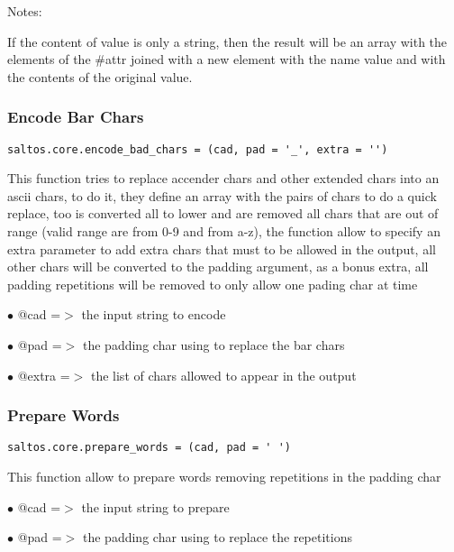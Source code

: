 \documentclass[a4paper]{article}
\begin{document}
Notes:

If the content of value is only a string, then the result will be an array with the
elements of the \#attr joined with a new element with the name value and with the contents
of the original value.

\hypertarget{toc713}{}
\subsubsection{Encode Bar Chars}

\begin{lstlisting}
saltos.core.encode_bad_chars = (cad, pad = '_', extra = '')
\end{lstlisting}

This function tries to replace accender chars and other extended chars into
an ascii chars, to do it, they define an array with the pairs of chars to
do a quick replace, too is converted all to lower and are removed all chars
that are out of range (valid range are from 0-9 and from a-z), the function
allow to specify an extra parameter to add extra chars that must to be
allowed in the output, all other chars will be converted to the padding
argument, as a bonus extra, all padding repetitions will be removed to
only allow one pading char at time

\begin{compactitem}
\item[\color{myblue}$\bullet$] @cad   =$>$ the input string to encode
\item[\color{myblue}$\bullet$] @pad   =$>$ the padding char using to replace the bar chars
\item[\color{myblue}$\bullet$] @extra =$>$ the list of chars allowed to appear in the output
\end{compactitem}

\hypertarget{toc714}{}
\subsubsection{Prepare Words}

\begin{lstlisting}
saltos.core.prepare_words = (cad, pad = ' ')
\end{lstlisting}

This function allow to prepare words removing repetitions in the padding char

\begin{compactitem}
\item[\color{myblue}$\bullet$] @cad =$>$ the input string to prepare
\item[\color{myblue}$\bullet$] @pad =$>$ the padding char using to replace the repetitions
\end{compactitem}
\end{document}
